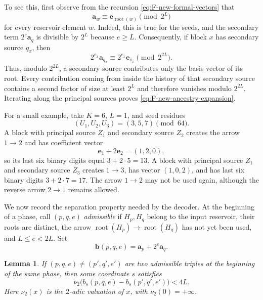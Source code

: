 \documentclass{article}
\newtheorem{lemma}[theorem]{Lemma}
\theoremstyle{definition}
\begin{document}
To see this, first observe from the recursion
\eqref{eq:F-new-formal-vectors} that
$$
 \mathbf a_w\equiv
 \mathbf e_{\operatorname{root}(w)}
 \pmod {2^L}
$$
for every reservoir element $w$.  Indeed, this is true for the seeds, and
the secondary term $2^e\mathbf a_q$ is divisible by $2^L$ because
$e\geq L$.  Consequently, if block $x$ has secondary source $q_x$, then
$$
 2^{e_x}\mathbf a_{q_x}
 \equiv
 2^{e_x}\mathbf e_{s_x}
 \pmod {2^{2L}}.
$$
Thus, modulo $2^{2L}$, a secondary source contributes only the basis vector
of its root.  Every contribution coming from inside the history of that
secondary source contains a second factor of size at least $2^L$ and
therefore vanishes modulo $2^{2L}$.  Iterating along the principal sources
proves \eqref{eq:F-new-ancestry-expansion}.


For a small example, take $K=6$, $L=1$, and seed residues
$$
 (U_1,U_2,U_3)=(3,5,7)\pmod {64}.
$$
A block with principal source $Z_1$ and secondary source $Z_2$ creates the arrow
$1\to2$ and has coefficient vector
$$
 \mathbf e_1+2\mathbf e_2=(1,2,0),
$$
so its last six binary digits equal $3+2\cdot5=13$.  A block with principal
source $Z_1$ and secondary source $Z_3$ creates $1\to3$, has vector $(1,0,2)$, and
has last six binary digits $3+2\cdot7=17$.  The arrow $1\to2$ may not be
used again, although the reverse arrow $2\to1$ remains allowed.

We now record the separation property needed by the decoder.  At the
beginning of a phase, call $(p,q,e)$ \emph{admissible} if $H_p,H_q$ belong to
the input reservoir, their roots are distinct, the arrow
$\operatorname{root}(H_p)\to\operatorname{root}(H_q)$ has not yet been used, and
$L\leq e<2L$.  Set
$$
 \mathbf b(p,q,e)=\mathbf a_p+2^e\mathbf a_q.
$$

\begin{lemma}
\label{lem:F-new-marker-separation}
If $(p,q,e)\neq(p',q',e')$ are two admissible triples at the beginning of the
same phase, then some coordinate $s$ satisfies
\begin{equation}
 \nu_2\bigl(b_s(p,q,e)-b_s(p',q',e')\bigr)<4L.
 \label{eq:F-new-triple-separation}
\end{equation}
Here $\nu_2(x)$ is the $2$-adic valuation of $x$, with
$\nu_2(0)=+\infty$.
\end{lemma}
\end{document}
